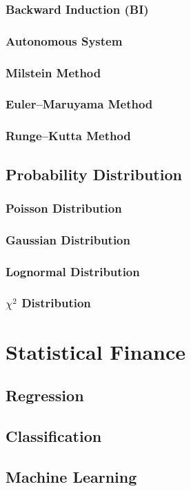\documentclass{book}
\begin{document}
\subsection{Backward Induction (BI)}
\subsection{Autonomous System}
\subsection{Milstein Method}
\subsection{Euler--Maruyama Method}
\subsection{Runge--Kutta Method}

\section{Probability Distribution}
\subsection{Poisson Distribution}
\subsection{Gaussian Distribution}
\subsection{Lognormal Distribution}
\subsection{$\chi^2$ Distribution}


\chapter{Statistical Finance}
\section{Regression}
\section{Classification}
\section{Machine Learning}
\end{document}
